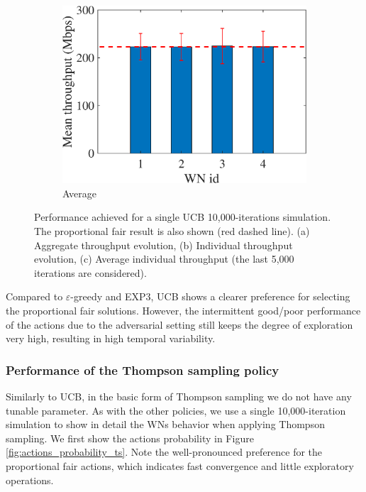 \documentclass[preprint,12pt]{elsarticle}
\begin{document}
\begin{figure}
\begin{subfigure}[b]{.3\textwidth}
		\includegraphics[width=\textwidth]{images/NEW_mean_tpt_UCB}
		\caption{Average}\label{fig:ucb_avg_individual}
	\end{subfigure}
	\caption{Performance achieved for a single UCB 10,000-iterations simulation. The proportional fair result is also shown (red dashed line). (a) Aggregate throughput evolution, (b) Individual throughput evolution, (c) Average individual throughput (the last 5,000 iterations are considered).}
	\label{fig:ucb_tpt}
\end{figure}

Compared to $\varepsilon$-greedy and EXP3, UCB shows a clearer preference for selecting the proportional fair solutions. However, the intermittent good/poor performance of the actions due to the adversarial setting still keeps the degree of exploration very high, resulting in high temporal variability.

\subsubsection{Performance of the Thompson sampling policy}
\label{section:ts_study}
Similarly to UCB, in the basic form of Thompson sampling we do not have any tunable parameter. As with the other policies, we use a single 10,000-iteration simulation to show in detail the WNs behavior when applying Thompson sampling. We first show the actions probability in Figure \ref{fig:actions_probability_ts}. Note the well-pronounced preference for the proportional fair actions, which indicates fast convergence and little exploratory operations.
\end{document}
